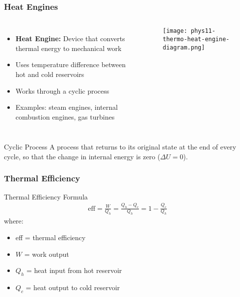 \documentclass{beamer}
\begin{document}
\begin{frame}
    \frametitle{Heat Engines}
    \begin{columns}
        \begin{itemize}
            \item \textbf{Heat Engine:} Device that converts thermal energy to mechanical work
            \item Uses temperature difference between hot and cold reservoirs
            \item Works through a cyclic process
            \item Examples: steam engines, internal combustion engines, gas turbines
        \end{itemize}
        
        \begin{center}
            \begin{figure}
                \centering
                \texttt{[image: phys11-thermo-heat-engine-diagram.png]}
            \end{figure}
        \end{center}
    \end{columns}
    
    \begin{block}{Cyclic Process}
        A process that returns to its original state at the end of every cycle, so that the change in internal energy is zero ($\Delta U = 0$).
    \end{block}
\end{frame}

\begin{frame}
    \frametitle{Thermal Efficiency}
    \begin{alertblock}{Thermal Efficiency Formula}
        \begin{align*}
            \text{eff} = \frac{W}{Q_h} = \frac{Q_h - Q_c}{Q_h} = 1 - \frac{Q_c}{Q_h}
        \end{align*}
        where:
        \begin{itemize}
            \item eff = thermal efficiency
            \item $W$ = work output
            \item $Q_h$ = heat input from hot reservoir
            \item $Q_c$ = heat output to cold reservoir
        \end{itemize}
    \end{alertblock}
    \end{frame}
\end{document}
